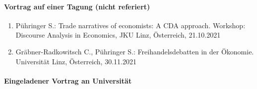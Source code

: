 \paragraph{Vortrag auf einer Tagung (nicht referiert)}
\begin{enumerate}
	\item Pühringer S.: Trade narratives of economists: A CDA approach. Workshop: Discourse Analysis in Economics, JKU Linz, Österreich, 21.10.2021
	\item Gräbner-Radkowitsch C., Pühringer S.: Freihandelsdebatten in der Ökonomie. Universität Linz, Österreich, 30.11.2021
\end{enumerate}
\paragraph{Eingeladener Vortrag an Universität}
